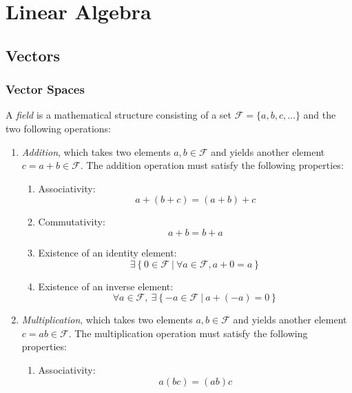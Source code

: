 \chapter[Linear Algebra]{Linear Algebra}
\section{Vectors} %
\subsection{Vector Spaces} %
\label{Subsec.VectorSpaces}
A \emph{field} is a mathematical structure consisting of a set $\mathcal{F}=\{a,b,c,\dots\}$ and the two following operations:
\begin{enumerate}
\item \emph{Addition}, which takes two elements $a,b \in \mathcal{F}$ and yields another element $c=a+b \in \mathcal{F}$. The addition operation must satisfy the following properties: %
\begin{enumerate}
	\item Associativity:
		\begin{equation*}
		a+(b+c) = (a+b)+c
		\end{equation*}
	\item Commutativity:
		\begin{equation*}
		a+b=b+a
		\end{equation*}
	\item Existence of an identity element:
		\begin{equation*}
		\exists \left\{0 \in\mathcal{F} \medspace \vert \medspace \forall a\in\mathcal{F}, a+0=a\right\}
		\end{equation*}
	\item Existence of an inverse element:
		\begin{equation*}
		\forall a \in\mathcal{F}, \medspace \exists \left\{-a \in \mathcal{F} \medspace \vert \medspace a+(-a)=0 \right\}
		\end{equation*}
\end{enumerate}
\item \emph{Multiplication}, which takes two elements $a,b \in \mathcal{F}$ and yields another element $c=ab \in \mathcal{F}$. The multiplication operation must satisfy the following properties:
\begin{enumerate}
	\item Associativity:
		\begin{equation*}
		a(bc)=(ab)c
		\end{equation*}

\end{enumerate}
\end{enumerate}
